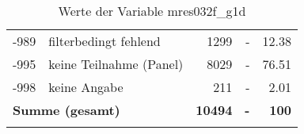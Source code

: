 \begin{longtable}{Xlrrr}
       -989 & filterbedingt fehlend & \num{1299} & - & \num[round-mode=places,round-precision=2]{12.38} \\

       -995 & keine Teilnahme (Panel) & \num{8029} & - & \num[round-mode=places,round-precision=2]{76.51} \\

       -998 & keine Angabe & \num{211} & - & \num[round-mode=places,round-precision=2]{2.01} \\

     \midrule
     \multicolumn{2}{l}{\textbf{Summe (gesamt)}} & \textbf{\num{10494}} & \textbf{-} & \textbf{\num{100}} \\
     \bottomrule
     \caption{Werte der Variable mres032f\_g1d}
     \end{longtable}
     
